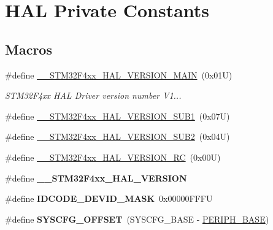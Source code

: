 \hypertarget{group___h_a_l___private___constants}{}\section{H\+AL Private Constants}
\label{group___h_a_l___private___constants}
\subsection*{Macros}
\begin{DoxyCompactItemize}
\item 
\#define \mbox{\hyperlink{group___h_a_l___private___constants_gadaedd4f6c52f98c7a4ba371ec551b6ce}{\+\_\+\+\_\+\+S\+T\+M32\+F4xx\+\_\+\+H\+A\+L\+\_\+\+V\+E\+R\+S\+I\+O\+N\+\_\+\+M\+A\+IN}}~(0x01\+U)
\begin{DoxyCompactList}\small\item\em S\+T\+M32\+F4xx H\+AL Driver version number V1... \end{DoxyCompactList}\item 
\#define \mbox{\hyperlink{group___h_a_l___private___constants_ga9d5e3917a3f5a417be6c8423faf78f0e}{\+\_\+\+\_\+\+S\+T\+M32\+F4xx\+\_\+\+H\+A\+L\+\_\+\+V\+E\+R\+S\+I\+O\+N\+\_\+\+S\+U\+B1}}~(0x07\+U)
\item 
\#define \mbox{\hyperlink{group___h_a_l___private___constants_ga87b379595edcc7d72d78b2263ae08dee}{\+\_\+\+\_\+\+S\+T\+M32\+F4xx\+\_\+\+H\+A\+L\+\_\+\+V\+E\+R\+S\+I\+O\+N\+\_\+\+S\+U\+B2}}~(0x04\+U)
\item 
\#define \mbox{\hyperlink{group___h_a_l___private___constants_ga61fad66d665ed89f1227e459e480e28b}{\+\_\+\+\_\+\+S\+T\+M32\+F4xx\+\_\+\+H\+A\+L\+\_\+\+V\+E\+R\+S\+I\+O\+N\+\_\+\+RC}}~(0x00\+U)
\item 
\#define {\bfseries \+\_\+\+\_\+\+S\+T\+M32\+F4xx\+\_\+\+H\+A\+L\+\_\+\+V\+E\+R\+S\+I\+ON}
\item 
\mbox{\label{group___h_a_l___private___constants_gaeeece10cca80f3c632d3d77c3f2917b6}} 
\#define {\bfseries I\+D\+C\+O\+D\+E\+\_\+\+D\+E\+V\+I\+D\+\_\+\+M\+A\+SK}~0x00000\+F\+F\+FU
\item 
\mbox{\label{group___h_a_l___private___constants_ga13f7abe3641989d4d063ad21962da8b0}} 
\#define {\bfseries S\+Y\+S\+C\+F\+G\+\_\+\+O\+F\+F\+S\+ET}~(S\+Y\+S\+C\+F\+G\+\_\+\+B\+A\+SE -\/ \mbox{\hyperlink{group___peripheral__memory__map_ga9171f49478fa86d932f89e78e73b88b0}{P\+E\+R\+I\+P\+H\+\_\+\+B\+A\+SE}})

\end{DoxyCompactItemize}
